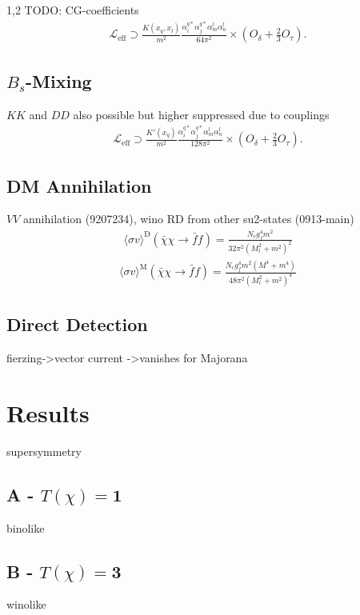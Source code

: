 \documentclass[11pt,a4paper,twoside]{article}
\numberwithin{equation}{section}
\begin{document}
\begin{spacing}{1,2}
TODO: CG-coefficients
\begin{align}
 \mathcal{L}_\text{eff} \supset \frac{K(x_q,x_l)}{m^2}\frac{\alpha_i^{q*} \alpha_j^{q*} \alpha_m^l \alpha_n^l}{64\pi^2}\times\left(O_\delta + \frac23 O_\tau\right).
 \label{eq_LagBSmumuModB}
\end{align}




\subsection{$B_s$-Mixing}
$KK$ and $DD$ also possible but higher suppressed due to couplings
\begin{align}
 \mathcal{L}_\text{eff} \supset \frac{K'(x_q)}{m^2}\frac{\alpha_i^{q*} \alpha_j^{q*} \alpha_m^l \alpha_n^l}{128\pi^2}\times\left(O_\delta + \frac23 O_\tau\right).
 \label{eq_LagBSmixModB}
\end{align}


\subsection{DM Annihilation}
$VV$ annihilation (9207234), wino RD from other su2-states (0913-main)
\begin{align}
 \langle \sigma v \rangle^\text{D} \left(\bar \chi \chi \rightarrow \bar f f\right) = \frac{N_c g_f^4 m^2}{32\pi^2\left(M_l^2 + m^2\right)^2}
\end{align}
\begin{align}
 \langle \sigma v \rangle^\text{M} \left(\bar \chi \chi \rightarrow \bar f f\right) = \frac{N_c g_f^4 m^2 \left(M^4+m^4 \right)}{48\pi^2\left(M_l^2 + m^2\right)^4}
\end{align}


\subsection{Direct Detection}
fierzing->vector current ->vanishes for Majorana

\section{Results}
supersymmetry
\subsection{A - $T(\chi)=\boldsymbol{1}$}
binolike
\subsection{B - $T(\chi)=\boldsymbol{3}$}
winolike

\end{spacing}
\end{document}
